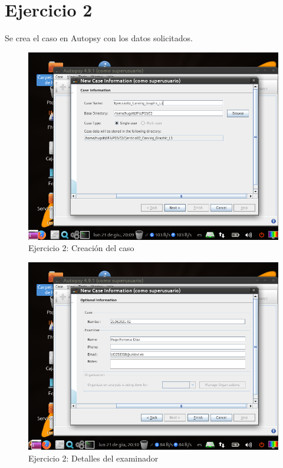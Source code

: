 \documentclass[11pt]{article}
\begin{document}
\section{Ejercicio 2}
Se crea el caso en Autopsy con los datos solicitados.

\begin{figure}[H]
  \caption{Ejercicio 2: Creación del caso}
  \centering
  \includegraphics[scale=0.7]{e2-1.png}
\end{figure}

\begin{figure}[H]
  \caption{Ejercicio 2: Detalles del examinador}
  \centering
  \includegraphics[scale=0.7]{e2-2.png}
\end{figure}
\end{document}

